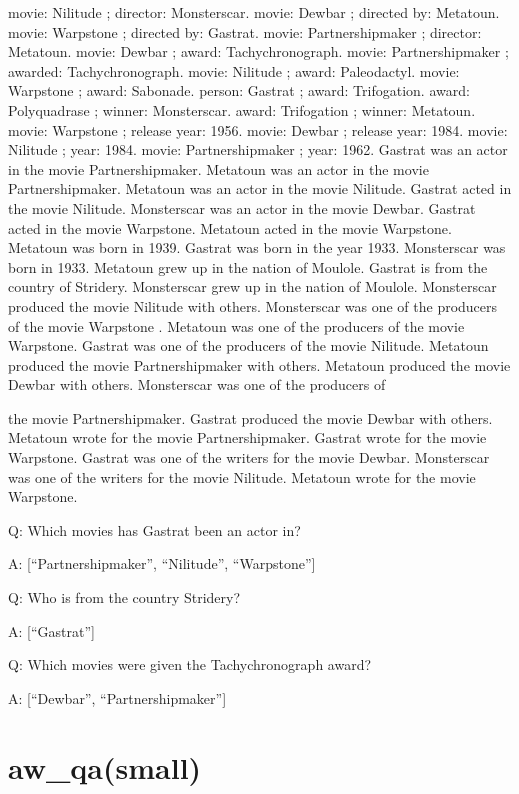 \documentclass[
]{article}
\begin{document}
movie: Nilitude ; director: Monsterscar. movie: Dewbar ; directed by:
Metatoun. movie: Warpstone ; directed by: Gastrat. movie:
Partnershipmaker ; director: Metatoun. movie: Dewbar ; award:
Tachychronograph. movie: Partnershipmaker ; awarded: Tachychronograph.
movie: Nilitude ; award: Paleodactyl. movie: Warpstone ; award:
Sabonade. person: Gastrat ; award: Trifogation. award: Polyquadrase ;
winner: Monsterscar. award: Trifogation ; winner: Metatoun. movie:
Warpstone ; release year: 1956. movie: Dewbar ; release year: 1984.
movie: Nilitude ; year: 1984. movie: Partnershipmaker ; year: 1962.
Gastrat was an actor in the movie Partnershipmaker. Metatoun was an
actor in the movie Partnershipmaker. Metatoun was an actor in the movie
Nilitude. Gastrat acted in the movie Nilitude. Monsterscar was an actor
in the movie Dewbar. Gastrat acted in the movie Warpstone. Metatoun
acted in the movie Warpstone. Metatoun was born in 1939. Gastrat was
born in the year 1933. Monsterscar was born in 1933. Metatoun grew up in
the nation of Moulole. Gastrat is from the country of Stridery.
Monsterscar grew up in the nation of Moulole. Monsterscar produced the
movie Nilitude with others. Monsterscar was one of the producers of the
movie Warpstone . Metatoun was one of the producers of the movie
Warpstone. Gastrat was one of the producers of the movie Nilitude.
Metatoun produced the movie Partnershipmaker with others. Metatoun
produced the movie Dewbar with others. Monsterscar was one of the
producers of

the movie Partnershipmaker. Gastrat produced the movie Dewbar with
others. Metatoun wrote for the movie Partnershipmaker. Gastrat wrote for
the movie Warpstone. Gastrat was one of the writers for the movie
Dewbar. Monsterscar was one of the writers for the movie Nilitude.
Metatoun wrote for the movie Warpstone.

Q: Which movies has Gastrat been an actor in?

A: {[}``Partnershipmaker'', ``Nilitude'', ``Warpstone''{]}

Q: Who is from the country Stridery?

A: {[}``Gastrat''{]}

Q: Which movies were given the Tachychronograph award?

A: {[}``Dewbar'', ``Partnershipmaker''{]}

\section{aw\_qa(small)}\label{aw_qasmall}
\end{document}
